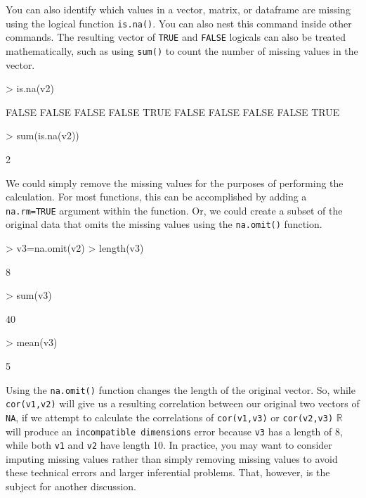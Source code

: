 \documentclass[12pt]{article}
\begin{document}
You can also identify which values in a vector, matrix, or dataframe are missing using the logical function \verb|is.na()|. You can also nest this command inside other commands. The resulting vector of \verb|TRUE| and \verb|FALSE| logicals can also be treated mathematically, such as using \verb|sum()| to count the number of missing values in the vector.
\begin{Schunk}
\begin{Sinput}
> is.na(v2)
\end{Sinput}
\begin{Soutput}
 [1] FALSE FALSE FALSE FALSE  TRUE FALSE FALSE FALSE FALSE  TRUE
\end{Soutput}
\begin{Sinput}
> sum(is.na(v2))
\end{Sinput}
\begin{Soutput}
[1] 2
\end{Soutput}
\end{Schunk}

We could simply remove the missing values for the purposes of performing the calculation. For most functions, this can be accomplished by adding a \verb|na.rm=TRUE| argument within the function. Or, we could create a subset of the original data that omits the missing values using the \verb|na.omit()| function.
\begin{Schunk}
\begin{Sinput}
> v3=na.omit(v2)
> length(v3)
\end{Sinput}
\begin{Soutput}
[1] 8
\end{Soutput}
\begin{Sinput}
> sum(v3)
\end{Sinput}
\begin{Soutput}
[1] 40
\end{Soutput}
\begin{Sinput}
> mean(v3)
\end{Sinput}
\begin{Soutput}
[1] 5
\end{Soutput}
\end{Schunk}

Using the \verb|na.omit()| function changes the length of the original vector. So, while \verb|cor(v1,v2)| will give us a resulting correlation between our original two vectors of \verb|NA|, if we attempt to calculate the correlations of \verb|cor(v1,v3)| or \verb|cor(v2,v3)| $\mathbb{R}$ will produce an \verb|incompatible dimensions| error because \verb|v3| has a length of 8, while both \verb|v1| and \verb|v2| have length 10. In practice, you may want to consider imputing missing values rather than simply removing missing values to avoid these technical errors and larger inferential problems. That, however, is the subject for another discussion.
\end{document}
